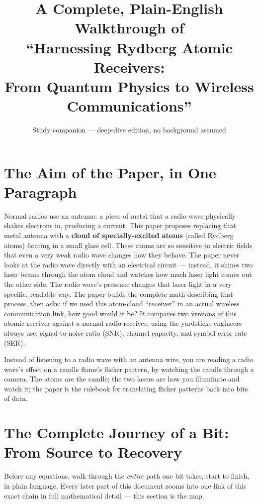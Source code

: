 \documentclass[11pt]{article}
\title{\bfseries A Complete, Plain-English Walkthrough of\\
``Harnessing Rydberg Atomic Receivers:\\ From Quantum Physics to Wireless Communications''}
\author{Study companion --- deep-dive edition, no background assumed}
\date{}
\begin{document}
\maketitle
\tableofcontents
\newpage

\section{The Aim of the Paper, in One Paragraph}
Normal radios use an antenna: a piece of metal that a radio wave physically shakes electrons in, producing a current. This paper proposes replacing that metal antenna with a \textbf{cloud of specially-excited atoms} (called Rydberg atoms) floating in a small glass cell. These atoms are so sensitive to electric fields that even a very weak radio wave changes how they behave. The paper never looks at the radio wave directly with an electrical circuit --- instead, it shines two laser beams through the atom cloud and watches how much laser light comes out the other side. The radio wave's presence changes that laser light in a very specific, readable way. The paper builds the complete math describing that process, then asks: if we used this atom-cloud ``receiver'' in an actual wireless communication link, how good would it be? It compares two versions of this atomic receiver against a normal radio receiver, using the yardsticks engineers always use: signal-to-noise ratio (SNR), channel capacity, and symbol error rate (SER).

\begin{plain}
Instead of listening to a radio wave with an antenna wire, you are reading a radio wave's effect on a candle flame's flicker pattern, by watching the candle through a camera. The atoms are the candle; the two lasers are how you illuminate and watch it; the paper is the rulebook for translating flicker patterns back into bits of data.
\end{plain}

\section*{The Complete Journey of a Bit: From Source to Recovery}
Before any equations, walk through the \emph{entire} path one bit takes, start to finish, in plain language. Every later part of this document zooms into one link of this exact chain in full mathematical detail --- this section is the map.
\end{document}
